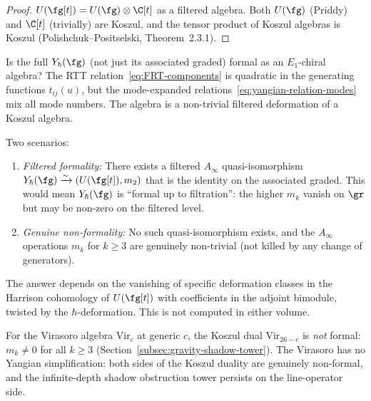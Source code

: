\begin{proof}
$U(\fg[t]) = U(\fg) \otimes \C[t]$ as a filtered algebra.
Both $U(\fg)$ (Priddy) and $\C[t]$ (trivially) are Koszul, and
the tensor product of Koszul algebras is Koszul
(Polishchuk--Positselski, Theorem~2.3.1).
\end{proof}

\begin{question}
Is the full $Y_\hbar(\fg)$ (not just its associated graded)
formal as an $E_1$-chiral algebra? The RTT
relation~\eqref{eq:FRT-components} is quadratic in the
generating functions $t_{ij}(u)$, but the mode-expanded
relations~\eqref{eq:yangian-relation-modes} mix all mode
numbers. The algebra is a non-trivial filtered deformation
of a Koszul algebra.

Two scenarios:
\begin{enumerate}[label=\textup{(\alph*)}]
\item \emph{Filtered formality:}
 There exists a filtered $A_\infty$ quasi-isomorphism
 $Y_\hbar(\fg) \xrightarrow{\sim} (U(\fg[t]), m_2)$
 that is the identity on the associated graded. This would
 mean $Y_\hbar(\fg)$ is ``formal up to filtration'': the
 higher $m_k$ vanish on $\gr$ but may be non-zero on the
 filtered level.
\item \emph{Genuine non-formality:}
 No such quasi-isomorphism exists, and the $A_\infty$
 operations $m_k$ for $k \ge 3$ are genuinely non-trivial
 (not killed by any change of generators).
\end{enumerate}
The answer depends on the vanishing of specific deformation
classes in the Harrison cohomology of $U(\fg[t])$ with
coefficients in the adjoint bimodule, twisted by the
$\hbar$-deformation. This is not computed in either volume.
\end{question}

\begin{remark}
For the Virasoro algebra $\mathrm{Vir}_c$ at generic $c$,
the Koszul dual $\mathrm{Vir}_{26-c}$ is \emph{not} formal:
$m_k \ne 0$ for all $k \ge 3$
(Section~\ref{subsec:gravity-shadow-tower}). The Virasoro
has no Yangian simplification: both sides of the Koszul
duality are genuinely non-formal, and the infinite-depth
shadow obstruction tower persists on the line-operator side.
\end{remark}

